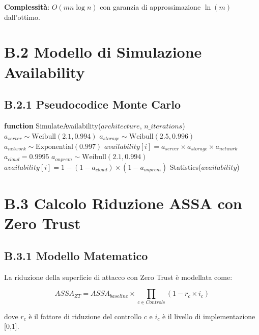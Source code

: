 \textbf{Complessità}: $O(mn \log n)$ con garanzia di approssimazione $\ln(m)$ dall'ottimo.

\section{B.2 Modello di Simulazione Availability}

\subsection{B.2.1 Pseudocodice Monte Carlo}

\begin{algorithmic}[1]
\State \textbf{function} SimulateAvailability($architecture$, $n\_iterations$)
        \State $a_{server} \sim \text{Weibull}(2.1, 0.994)$
        \State $a_{storage} \sim \text{Weibull}(2.5, 0.996)$
        \State $a_{network} \sim \text{Exponential}(0.997)$
        \State $availability[i] = a_{server} \times a_{storage} \times a_{network}$
        \State $a_{cloud} = 0.9995$ 
        \State $a_{onprem} \sim \text{Weibull}(2.1, 0.994)$
        \State $availability[i] = 1 - (1 - a_{cloud}) \times (1 - a_{onprem})$
    \EndIf
\EndFor
\State \Return Statistics($availability$)
\end{algorithmic}

\section{B.3 Calcolo Riduzione ASSA con Zero Trust}

\subsection{B.3.1 Modello Matematico}

La riduzione della superficie di attacco con Zero Trust è modellata come:

\begin{equation}
ASSA_{ZT} = ASSA_{baseline} \times \prod_{c \in Controls} (1 - r_c \times i_c)
\end{equation}

dove $r_c$ è il fattore di riduzione del controllo $c$ e $i_c$ è il livello di implementazione [0,1].

